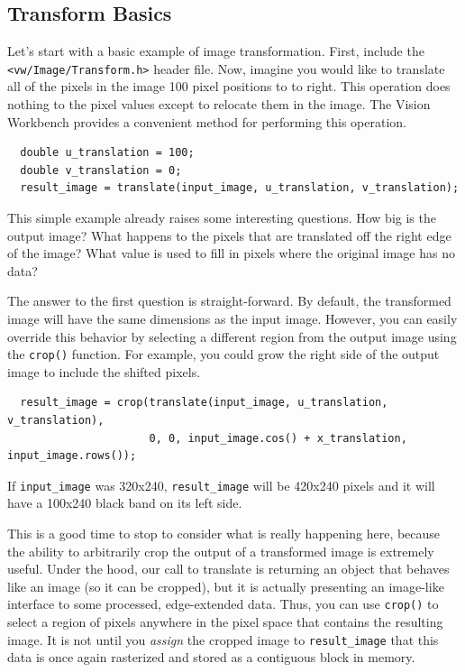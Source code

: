 \subsection{Transform Basics}

Let's start with a basic example of image transformation.  First,
include the \verb#<vw/Image/Transform.h># header file.  Now, imagine
you would like to translate all of the pixels in the image 100 pixel
positions to to right.  This operation does nothing to the pixel
values except to relocate them in the image.  The Vision Workbench
provides a convenient method for performing this operation.

\begin{verbatim}
  double u_translation = 100;
  double v_translation = 0;
  result_image = translate(input_image, u_translation, v_translation);
\end{verbatim}

This simple example already raises some interesting questions.  How
big is the output image?  What happens to the pixels that are
translated off the right edge of the image?  What value is used to
fill in pixels where the original image has no data?

The answer to the first question is straight-forward.  By default, the
transformed image will have the same dimensions as the input image.
However, you can easily override this behavior by selecting a
different region from the output image using the \verb#crop()#
function.  For example, you could grow the right side of the output
image to include the shifted pixels.

\begin{verbatim} 
  result_image = crop(translate(input_image, u_translation, v_translation), 
                      0, 0, input_image.cos() + x_translation, input_image.rows());
\end{verbatim}

If \verb#input_image# was 320x240, \verb#result_image# will be 420x240
pixels and it will have a 100x240 black band on its left side.

This is a good time to stop to consider what is really happening here,
because the ability to arbitrarily crop the output of a transformed
image is extremely useful.  Under the hood, our call to translate is
returning an object that behaves like an image (so it can be cropped),
but it is actually presenting an image-like interface to some
processed, edge-extended data.  Thus, you can use \verb#crop()# to
select a region of pixels anywhere in the pixel space that contains
the resulting image.  It is not until you {\em assign} the cropped
image to \verb#result_image# that this data is once again rasterized
and stored as a contiguous block in memory.

